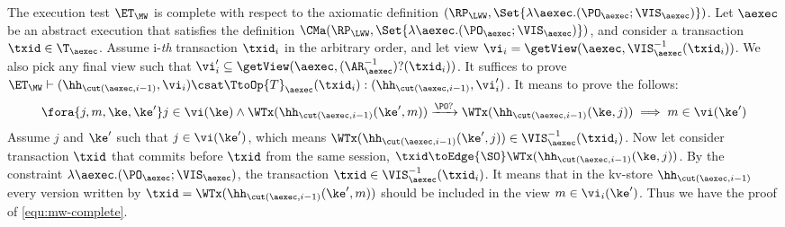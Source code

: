 The execution test $\ET_{\MW}$ is complete with respect to 
the axiomatic definition $(\RP_{\LWW}, \Set{\lambda \aexec.(\PO_{\aexec} ; \VIS_{\aexec})})$. 
Let $\aexec$ be an abstract execution that satisfies the definition
$\CMa(\RP_{\LWW}, \Set{\lambda \aexec.(\PO_{\aexec} ; \VIS_{\aexec})})$, 
and consider a transaction $\txid \in \T_{\aexec}$. 
Assume i-\emph{th} transaction \( \txid_i \) in the arbitrary order,
and let view \( \vi_{i} = \getView(\aexec, \VIS^{-1}_{\aexec}(\txid_{i}) ) \).
We also pick any final view such that \( \vi'_{i} \subseteq \getView(\aexec, (\AR^{-1}_{\aexec})?(\txid_{i}) ) \).
It suffices to prove \( \ET_\MW \vdash (\hh_{\cut(\aexec, i-1)}, \vi_i ) \csat  \TtoOp{T}_{\aexec}(\txid_{i}) : (\hh_{\cut(\aexec, i-1)}, \vi'_{i}) \).
It means to prove the follows:
\begin{equation}
\label{equ:mw-complete}
\begin{array}{@{}l@{}}
    \fora{j,m,\ke, \ke' } j \in \vi(\ke)  
    \wedge \WTx(\hh_{\cut(\aexec, i-1)}(\ke', m)) \xrightarrow{\PO?} \WTx(\hh_{\cut(\aexec, i-1)}(\ke, j))  
    \implies m \in \vi(\ke')
\end{array}
\end{equation}
Assume \( j \) and \( \ke' \) such that \( j \in \vi(\ke')\), which means \( \WTx(\hh_{\cut(\aexec, i-1)}(\ke', j)) \in \VIS^{-1}_{\aexec}(\txid_{i}) \).
Now let consider transaction \( \txid \) that commits before \( \txid \) from the same session, \ie \( \txid \toEdge{\SO} \WTx(\hh_{\cut(\aexec, i-1)}(\ke, j)) \).
By the constraint \( \lambda \aexec.(\PO_{\aexec} ; \VIS_{\aexec}) \), the transaction \( \txid \in \VIS^{-1}_{\aexec}(\txid_{i}) \).
It means that in the kv-store \(  \hh_{\cut(\aexec, i-1)} \) every version written by \( \txid =  \WTx(\hh_{\cut(\aexec, i-1)}(\ke', m)) \) should be included in the view \( m \in \vi_i(\ke') \).
Thus we have the proof of \cref{equ:mw-complete}.
